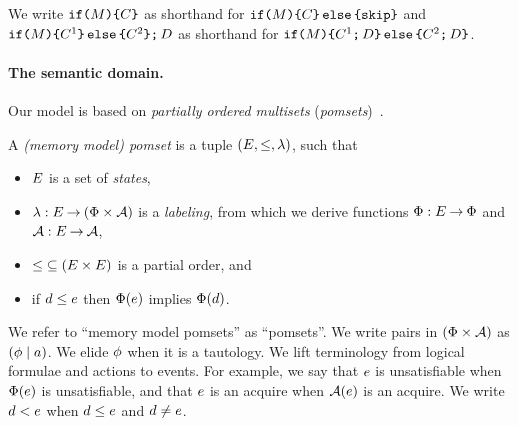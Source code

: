 We write
$\texttt{if}\allowbreak\texttt{(}M\texttt{)} \allowbreak\texttt{\{} C \texttt{\}}$ as shorthand for
$\texttt{if}\allowbreak\texttt{(}M\texttt{)} \allowbreak\texttt{\{} C\texttt{\}}\,\allowbreak\texttt{else}\allowbreak\,\texttt{\{} \texttt{skip}\texttt{\}}$ and
$\texttt{if}\allowbreak\texttt{(}M\texttt{)} \allowbreak\texttt{\{} C^1 \texttt{\}}\,\allowbreak\texttt{else}\allowbreak\,\texttt{\{} C^2 \texttt{\}} \texttt{;}\,\allowbreak D$ as shorthand for
$\texttt{if}\allowbreak\texttt{(}M\texttt{)} \allowbreak\texttt{\{} C^1 \texttt{;}\,\allowbreak D\texttt{\}}\,\allowbreak\texttt{else}\allowbreak\,\texttt{\{} C^2 \texttt{;}\,\allowbreak D\texttt{\}}$.

\paragraph{The semantic domain.}
Our model is based on \emph{partially ordered multisets} (\emph{pomsets})~\cite{GISCHER1988199}.
\begin{definition}
  \label{def:mmpomset}
  A \emph{(memory model) pomset} is a tuple
  $(\Event, {\le}, %
  \labeling)$, such that
  \begin{itemize}
  \item $E$ is a set of \emph{states},
  \item $\lambda: E \mathbin\rightarrow (\Phi\times\mathcal{A})$ is a \emph{labeling},
    from which we derive functions $\Phi:E\mathbin\rightarrow\Phi$ and $\mathcal{A}:E\mathbin\rightarrow\mathcal{A}$,
  \item ${\le} \subseteq (E\times E)$ is a partial order, and
  \item if $d\le e$ then $\Phi(e)$ implies
    $\Phi(d)$.
  \end{itemize}
\end{definition}
We refer to ``memory model pomsets'' as ``{pomsets}''.
We write pairs in $(\Phi\times\mathcal{A})$ as $(\phi \mid a)$.  We elide
$\phi$ when it is a tautology.
%
We lift terminology from logical formulae and actions to events. For example,
we say that $e$ is unsatisfiable when $\Phi(e)$ is unsatisfiable,
and that $e$ is an acquire when $\mathcal{A}(e)$ is an acquire.
We write $d<e$ when $d\le e$ and $d\neq e$.

